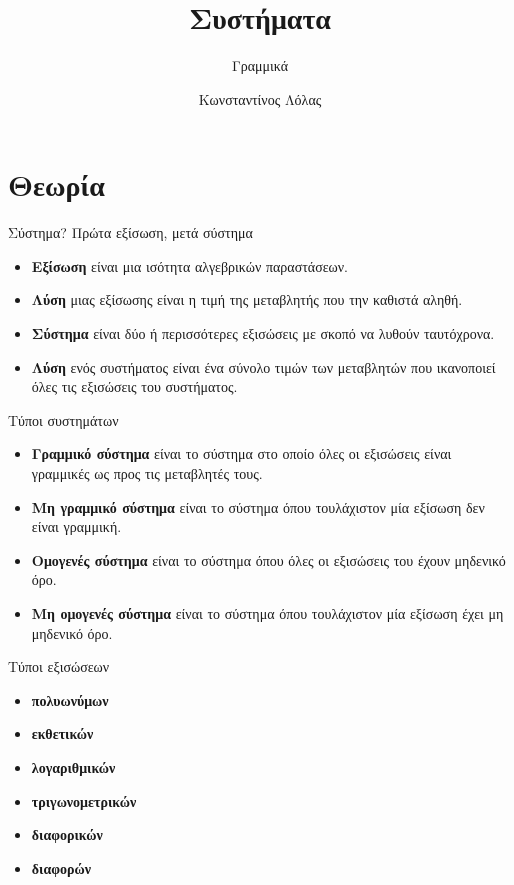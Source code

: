 \documentclass{../presentation}
\title{Συστήματα}
\subtitle{Γραμμικά}
\author[Λόλας]{Κωνσταντίνος Λόλας}
\date{}
\begin{document}
\begin{frame}
  \titlepage
\end{frame}

\section{Θεωρία}
\begin{frame}{Σύστημα?}
  Πρώτα εξίσωση, μετά σύστημα
  \begin{itemize}[<+->]
    \item \textbf{Εξίσωση} είναι μια ισότητα αλγεβρικών παραστάσεων.
    \item \textbf{Λύση} μιας εξίσωσης είναι η τιμή της μεταβλητής που την καθιστά αληθή.
    \item \textbf{Σύστημα} είναι δύο ή περισσότερες εξισώσεις με σκοπό να λυθούν ταυτόχρονα.
    \item \textbf{Λύση} ενός συστήματος είναι ένα σύνολο τιμών των μεταβλητών που ικανοποιεί όλες τις εξισώσεις του συστήματος.
  \end{itemize}
\end{frame}

\begin{frame}{Τύποι συστημάτων}
  \begin{itemize}[<+->]
    \item \textbf{Γραμμικό σύστημα} είναι το σύστημα στο οποίο όλες οι εξισώσεις είναι γραμμικές ως προς τις μεταβλητές τους.
    \item \textbf{Μη γραμμικό σύστημα} είναι το σύστημα όπου τουλάχιστον μία εξίσωση δεν είναι γραμμική.
    \item \textbf{Ομογενές σύστημα} είναι το σύστημα όπου όλες οι εξισώσεις του έχουν μηδενικό όρο.
    \item \textbf{Μη ομογενές σύστημα} είναι το σύστημα όπου τουλάχιστον μία εξίσωση έχει μη μηδενικό όρο.
  \end{itemize}
\end{frame}

\begin{frame}{Τύποι εξισώσεων}
  \begin{itemize}[<+->]
    \item \textbf{πολυωνύμων}
    \item \textbf{εκθετικών}
    \item \textbf{λογαριθμικών}
    \item \textbf{τριγωνομετρικών}
    \item \textbf{διαφορικών}
    \item \textbf{διαφορών}
  \end{itemize}
\end{frame}
\end{document}
